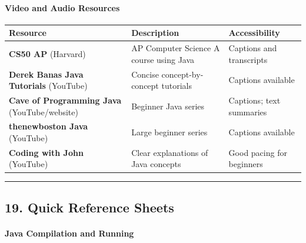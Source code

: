 \documentclass[
  justified,
  openright,
]{tufte-book}
\let\subsubsection\paragraph
\let\paragraph\paragraph
\let\subsubsection\paragraph
\let\paragraph\paragraph
\begin{document}
\subsubsection{Video and Audio
Resources}\label{video-and-audio-resources}

{\def\LTcaptype{none} %
\begin{longtable}[]{@{}
  >{\raggedright\arraybackslash}p{}
  >{\raggedright\arraybackslash}p{}
  >{\raggedright\arraybackslash}p{}@{}}
\toprule\noalign{}
\begin{minipage}[b]{\linewidth}\raggedright
Resource
\end{minipage} & \begin{minipage}[b]{\linewidth}\raggedright
Description
\end{minipage} & \begin{minipage}[b]{\linewidth}\raggedright
Accessibility
\end{minipage} \\
\midrule\noalign{}
\endhead
\bottomrule\noalign{}
\endlastfoot
\textbf{CS50 AP} (Harvard) & AP Computer Science A course using Java &
Captions and transcripts \\
\textbf{Derek Banas Java Tutorials} (YouTube) & Concise
concept-by-concept tutorials & Captions available \\
\textbf{Cave of Programming Java} (YouTube/website) & Beginner Java
series & Captions; text summaries \\
\textbf{thenewboston Java} (YouTube) & Large beginner series & Captions
available \\
\textbf{Coding with John} (YouTube) & Clear explanations of Java
concepts & Good pacing for beginners \\
\end{longtable}
}

\begin{center}\rule{0.5\linewidth}{0.5pt}\end{center}

\subsection{19. Quick Reference Sheets}\label{quick-reference-sheets}

\subsubsection{Java Compilation and
Running}\label{java-compilation-and-running}
\end{document}
